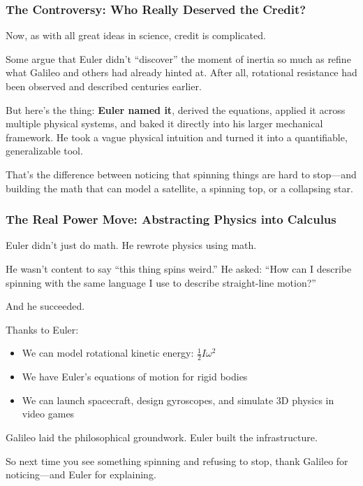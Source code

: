 \subsubsection{The Controversy: Who Really Deserved the Credit?}

Now, as with all great ideas in science, credit is complicated.

Some argue that Euler didn’t “discover” the moment of inertia so much as refine what Galileo and others had already hinted at. After all, rotational resistance had been observed and described centuries earlier.

But here’s the thing: \textbf{Euler named it}, derived the equations, applied it across multiple physical systems, and baked it directly into his larger mechanical framework. He took a vague physical intuition and turned it into a quantifiable, generalizable tool.

That’s the difference between noticing that spinning things are hard to stop—and building the math that can model a satellite, a spinning top, or a collapsing star.

\subsubsection{The Real Power Move: Abstracting Physics into Calculus}

Euler didn’t just do math. He rewrote physics using math.

He wasn’t content to say “this thing spins weird.” He asked: “How can I describe spinning with the same language I use to describe straight-line motion?”

And he succeeded.

Thanks to Euler:
\begin{itemize}
    \item We can model rotational kinetic energy: \( \frac{1}{2} I \omega^2 \)
    \item We have Euler’s equations of motion for rigid bodies
    \item We can launch spacecraft, design gyroscopes, and simulate 3D physics in video games
\end{itemize}

Galileo laid the philosophical groundwork. Euler built the infrastructure.

\begin{center}
\end{center}

So next time you see something spinning and refusing to stop, thank Galileo for noticing—and Euler for explaining.
